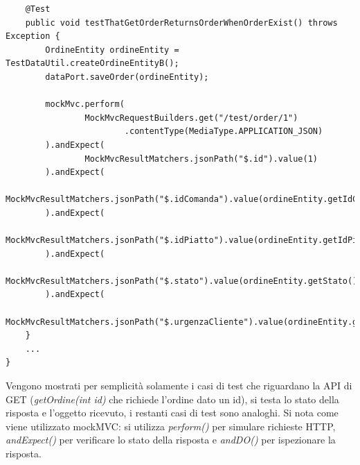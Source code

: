 \begin{lstlisting}
    @Test
    public void testThatGetOrderReturnsOrderWhenOrderExist() throws Exception {
        OrdineEntity ordineEntity = TestDataUtil.createOrdineEntityB();
        dataPort.saveOrder(ordineEntity);

        mockMvc.perform(
                MockMvcRequestBuilders.get("/test/order/1")
                        .contentType(MediaType.APPLICATION_JSON)
        ).andExpect(
                MockMvcResultMatchers.jsonPath("$.id").value(1)
        ).andExpect(
                MockMvcResultMatchers.jsonPath("$.idComanda").value(ordineEntity.getIdComanda())
        ).andExpect(
                MockMvcResultMatchers.jsonPath("$.idPiatto").value(ordineEntity.getIdPiatto())
        ).andExpect(
                MockMvcResultMatchers.jsonPath("$.stato").value(ordineEntity.getStato())
        ).andExpect(
                MockMvcResultMatchers.jsonPath("$.urgenzaCliente").value(ordineEntity.getUrgenzaCliente()));
    }
    ...
}
\end{lstlisting}
Vengono mostrati per semplicità solamente i casi di test che riguardano la API di GET (\textit{getOrdine(int id)} che richiede l'ordine dato un id), si testa lo stato della risposta e l'oggetto ricevuto, i restanti casi di test sono analoghi.
Si nota come viene utilizzato mockMVC: si utilizza \textit{perform()} per simulare richieste HTTP, \textit{andExpect()} per verificare lo stato della risposta e \textit{andDO()} per ispezionare la risposta.

